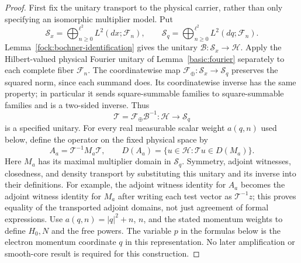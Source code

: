 \documentclass[11pt,a4paper]{article}
\theoremstyle{definition}
\theoremstyle{remark}
\begin{document}
\begin{proof}
First fix the unitary transport to the physical carrier, rather than
only specifying an isomorphic multiplier model. Put
\[
 \mathcal S_x=\bigoplus_{n\geq0}^{\ell^2}L^2(dx;\mathcal F_n),\qquad
 \mathcal S_q=\bigoplus_{n\geq0}^{\ell^2}L^2(dq;\mathcal F_n).
\]
Lemma~\ref{fock:bochner-identification} gives the unitary
$\mathcal B:\mathcal S_x\to\mathcal H$. Apply the Hilbert-valued
physical Fourier unitary of Lemma~\ref{basic:fourier} separately to
each complete fiber $\mathcal F_n$. The coordinatewise map
$\mathcal F_\oplus:\mathcal S_x\to\mathcal S_q$ preserves the squared
norm, since each summand does. Its coordinatewise inverse has the
same property; in particular it sends square-summable families to
square-summable families and is a two-sided inverse. Thus
\[
 \mathcal T=\mathcal F_\oplus\mathcal B^{-1}:
       \mathcal H\longrightarrow\mathcal S_q
\]
is a specified unitary. For every real measurable scalar weight
$a(q,n)$ used below, define the operator on the fixed physical space by
\[
 A_a=\mathcal T^{-1}M_a\mathcal T,\qquad
 D(A_a)=\{u\in\mathcal H:\mathcal Tu\in D(M_a)\}.
\]
Here $M_a$ has its maximal multiplier domain in $\mathcal S_q$.
Symmetry, adjoint witnesses, closedness, and density transport by
substituting this unitary and its inverse into their definitions.
For example, the adjoint witness identity for $A_a$ becomes the
adjoint witness identity for $M_a$ after writing each test vector as
$\mathcal T^{-1}z$; this proves equality of the transported adjoint
domains, not just agreement of formal expressions.
Use $a(q,n)=|q|^2+n$, $n$, and the stated momentum weights to define
$H_0,N$ and the free powers. The variable $p$ in the formulas below
is the electron momentum coordinate $q$ in this representation.
No later amplification or smooth-core result is required for this
construction.


\end{proof}
\end{document}
